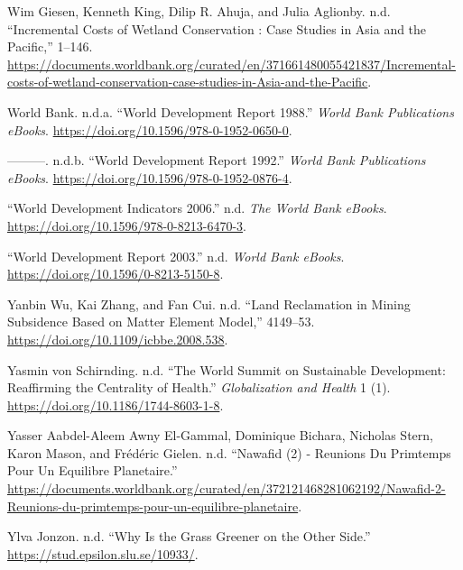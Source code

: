 \begin{CSLReferences}{1}{0}
Wim Giesen, Kenneth King, Dilip R. Ahuja, and Julia Aglionby. n.d.
{``Incremental Costs of Wetland Conservation : Case Studies in Asia and
the Pacific,''} 1--146.
\url{https://documents.worldbank.org/curated/en/371661480055421837/Incremental-costs-of-wetland-conservation-case-studies-in-Asia-and-the-Pacific}.

World Bank. n.d.a. {``World Development Report 1988.''} \emph{World Bank
Publications eBooks}. \url{https://doi.org/10.1596/978-0-1952-0650-0}.

---------. n.d.b. {``World Development Report 1992.''} \emph{World Bank
Publications eBooks}. \url{https://doi.org/10.1596/978-0-1952-0876-4}.

{``World Development Indicators 2006.''} n.d. \emph{The World Bank
eBooks}. \url{https://doi.org/10.1596/978-0-8213-6470-3}.

{``World Development Report 2003.''} n.d. \emph{World Bank eBooks}.
\url{https://doi.org/10.1596/0-8213-5150-8}.

Yanbin Wu, Kai Zhang, and Fan Cui. n.d. {``Land Reclamation in Mining
Subsidence Based on Matter Element Model,''} 4149--53.
\url{https://doi.org/10.1109/icbbe.2008.538}.

Yasmin von Schirnding. n.d. {``The World Summit on Sustainable
Development: Reaffirming the Centrality of Health.''}
\emph{Globalization and Health} 1 (1).
\url{https://doi.org/10.1186/1744-8603-1-8}.

Yasser Aabdel-Aleem Awny El-Gammal, Dominique Bichara, Nicholas Stern,
Karon Mason, and Frédéric Gielen. n.d. {``Nawafid (2) - Reunions Du
Primtemps Pour Un Equilibre Planetaire.''}
\url{https://documents.worldbank.org/curated/en/372121468281062192/Nawafid-2-Reunions-du-primtemps-pour-un-equilibre-planetaire}.

Ylva Jonzon. n.d. {``Why Is the Grass Greener on the Other Side.''}
\url{https://stud.epsilon.slu.se/10933/}.


\end{CSLReferences}
